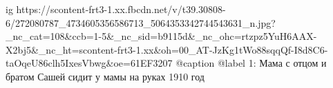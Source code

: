  
 
 
 
 

\ifcmt
  ig https://scontent-frt3-1.xx.fbcdn.net/v/t39.30808-6/272080787_4734605356586713_5064353342744543631_n.jpg?_nc_cat=108&ccb=1-5&_nc_sid=b9115d&_nc_ohc=rtzpz5YuH6AAX-X2bj5&_nc_ht=scontent-frt3-1.xx&oh=00_AT-JzKg1tWo88sqqQf-I8d8C6-taOqeU86clh5IxesVbwg&oe=61EF3207
  @caption @label 1: Мама с отцом и братом Сашей сидит у мамы на руках 1910 год
\fi
